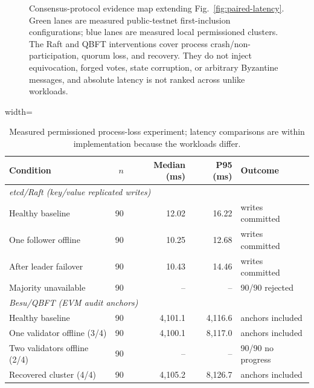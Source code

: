 \documentclass[journal]{IEEEtran}
\begin{document}
\begin{figure}[!t]
\caption{Consensus-protocol evidence map extending
Fig.~\ref{fig:paired-latency}. Green lanes are measured public-testnet
first-inclusion configurations; blue lanes are measured local permissioned
clusters. The Raft and QBFT interventions cover process
crash/non-participation, quorum loss, and recovery. They do not inject
equivocation, forged votes, state corruption, or arbitrary Byzantine
messages, and absolute latency is not ranked across unlike workloads.}
\label{fig:consensus-protocols}
\end{figure}
\begin{table}[!t]
\centering
\caption{Measured permissioned process-loss experiment; latency comparisons
are within implementation because the workloads differ.}
\label{tab:permissioned-fault-results}
\footnotesize
\setlength{\tabcolsep}{3.5pt}
\begin{adjustbox}{width=\columnwidth}
\begin{tabular}{lrrrl}
\toprule
Condition & $n$ & Median (ms) & P95 (ms) & Outcome \\
\midrule
\multicolumn{5}{l}{\emph{etcd/Raft (key/value replicated writes)}} \\
\quad Healthy baseline & 90 & 12.02 & 16.22 & writes committed \\
\quad One follower offline & 90 & 10.25 & 12.68 & writes committed \\
\quad After leader failover & 90 & 10.43 & 14.46 & writes committed \\
\quad Majority unavailable & 90 & -- & -- & 90/90 rejected \\
\midrule
\multicolumn{5}{l}{\emph{Besu/QBFT (EVM audit anchors)}} \\
\quad Healthy baseline & 90 & 4{,}101.1 & 4{,}116.6 & anchors included \\
\quad One validator offline (3/4) & 90 & 4{,}100.1 & 8{,}117.0 & anchors included \\
\quad Two validators offline (2/4) & 90 & -- & -- & 90/90 no progress \\
\quad Recovered cluster (4/4) & 90 & 4{,}105.2 & 8{,}126.7 & anchors included \\
\bottomrule
\end{tabular}
\end{adjustbox}
\end{table}
\end{document}
